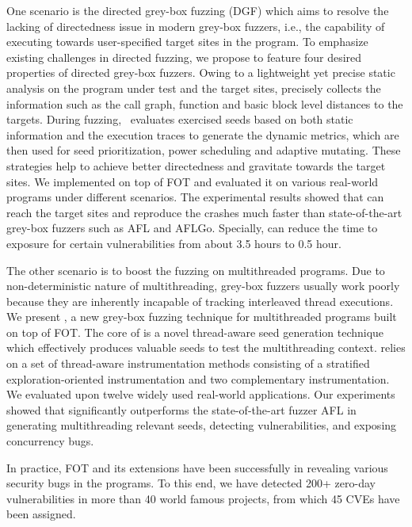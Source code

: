 One scenario is the directed grey-box fuzzing (DGF) which aims to resolve the lacking of directedness issue in modern grey-box fuzzers, i.e., the capability of executing towards user-specified target sites in the program.
To emphasize existing challenges in \mbox{directed} fuzzing, we propose \dFOT to feature four desired properties of directed grey-box fuzzers.
Owing to a lightweight yet precise static analysis on the program under test and the target sites, \dFOT precisely collects the information such as the call graph, function and \mbox{basic} block level distances to the targets.
During fuzzing, \dFOT~{evaluates} exercised seeds based on both static information and the \mbox{execution} traces to generate the dynamic metrics, which are then used for seed prioritization, power scheduling and adaptive \mbox{mutating}.
These strategies help \dFOT to achieve better directedness and gravitate towards the target sites.
We implemented \dFOT on top of FOT and evaluated it on various real-world \mbox{programs} under different scenarios.
The experimental results showed that \dFOT can reach the target sites and reproduce the crashes much faster than state-of-the-art grey-box fuzzers such as AFL and AFLGo. Specially, \dFOT can reduce the time to exposure for certain vulnerabilities from about 3.5 hours to 0.5 hour. 

The other scenario is to boost the fuzzing on multithreaded programs. Due to non-deterministic nature of multithreading, grey-box fuzzers usually work poorly because they are inherently incapable of tracking interleaved thread executions. We present \mtfuzz, a new grey-box fuzzing technique for multithreaded programs built on top of FOT. The core of \mtfuzz is a novel thread-aware seed generation technique which effectively produces valuable seeds to test the multithreading context. \mtfuzz relies on a set of thread-aware instrumentation methods consisting of a stratified exploration-oriented instrumentation and two complementary instrumentation. We evaluated \mtfuzz upon twelve widely used real-world applications. Our experiments showed that \mtfuzz significantly outperforms the state-of-the-art fuzzer AFL in generating multithreading relevant seeds, detecting vulnerabilities, and exposing concurrency bugs.

In practice, FOT and its extensions have been successfully in revealing various security bugs in the programs. To this end, we have detected 200+ zero-day vulnerabilities in more than 40 world famous projects, from which 45 CVEs have been assigned.

